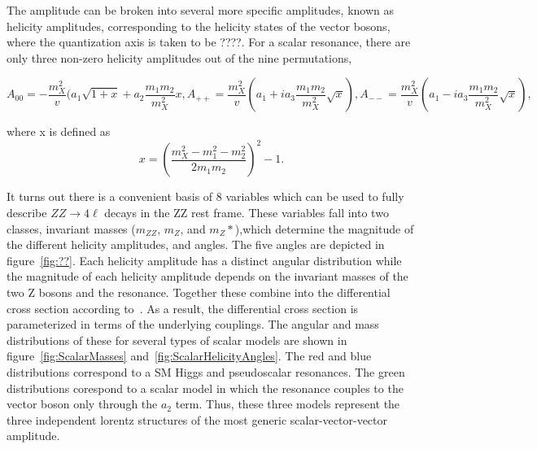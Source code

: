 The amplitude can be broken into several 
more specific amplitudes, known as helicity amplitudes, corresponding to the 
helicity states of the 
vector bosons, where the quantization axis is taken to be ????.  For a scalar
resonance, there are only three non-zero helicity amplitudes out of the 
nine permutations,

\begin{center}
\begin{subequations}
  \begin{equation}
    A_{00} = -\frac{m_X^2}{v}(a_1\sqrt{1+x}+a_2\frac{m_1m_2}{m_X^2}x,    \end{equation}
  \begin{equation}
    A_{++} = \frac{m_X^2}{v}(a_1+ia_3\frac{m_1m_2}{m_X^2}\sqrt{x}),
    \end{equation}
  \begin{equation}
    A_{--} = \frac{m_X^2}{v}(a_1-ia_3\frac{m_1m_2}{m_X^2}\sqrt{x}),
    \end{equation}
\end{subequations}
\end{center}
where x is defined as
\begin{equation}
x=(\frac{m_X^2-m_1^2-m_2^2}{2m_1m_2})^2-1.
\end{equation}

It turns out there is a convenient basis of 8 variables which can be
used to fully describe $ZZ\to4\ell$ decays in the ZZ rest frame.  These
variables fall into two classes, invariant masses ($m_{ZZ}$, $m_Z$, and 
$m_Z*$),which determine the 
magnitude of the different helicity amplitudes, and angles.  The five 
angles are depicted in figure~\ref{fig:??}.
Each helicity amplitude has a distinct angular distribution while the
magnitude of each helicity amplitude depends on the invariant masses 
of the two Z bosons and the resonance.  Together these combine into the
differential cross section according to~\cite{???}.
As a result, the differential cross section is parameterized in terms of 
the underlying couplings. 
The angular and mass distributions of these for several types of scalar 
models are shown in figure~\ref{fig:ScalarMasses} 
and~\ref{fig:ScalarHelicityAngles}.  The red and blue distributions
correspond to a SM Higgs and pseudoscalar resonances.  The green 
distributions corespond to a scalar model in which the resonance couples
to the vector boson only through the $a_2$ term.  Thus, these three models 
represent the three independent lorentz structures of the most generic
scalar-vector-vector amplitude.  

